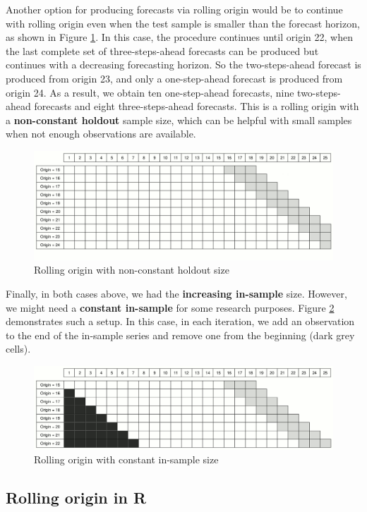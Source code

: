 \documentclass[
]{book}
\theoremstyle{definition}
\theoremstyle{definition}
\theoremstyle{definition}
\theoremstyle{definition}
\theoremstyle{remark}
\begin{document}
Another option for producing forecasts via rolling origin would be to continue with rolling origin even when the test sample is smaller than the forecast horizon, as shown in Figure \ref{fig:ROProcessNoCO}. In this case, the procedure continues until origin 22, when the last complete set of three-steps-ahead forecasts can be produced but continues with a decreasing forecasting horizon. So the two-steps-ahead forecast is produced from origin 23, and only a one-step-ahead forecast is produced from origin 24. As a result, we obtain ten one-step-ahead forecasts, nine two-steps-ahead forecasts and eight three-steps-ahead forecasts. This is a rolling origin with a \textbf{non-constant holdout} sample size, which can be helpful with small samples when not enough observations are available.

\begin{figure}
\includegraphics[width=0.75\linewidth]{./images/03-ROProcessNoCO} \caption{Rolling origin with non-constant holdout size}\label{fig:ROProcessNoCO}
\end{figure}

Finally, in both cases above, we had the \textbf{increasing in-sample} size. However, we might need a \textbf{constant in-sample} for some research purposes. Figure \ref{fig:ROProcessCOCI} demonstrates such a setup. In this case, in each iteration, we add an observation to the end of the in-sample series and remove one from the beginning (dark grey cells).

\begin{figure}
\includegraphics[width=0.75\linewidth]{./images/03-ROProcessCOCI} \caption{Rolling origin with constant in-sample size}\label{fig:ROProcessCOCI}
\end{figure}

\hypertarget{rolling-origin-in-r}{%
\subsection{Rolling origin in R}\label{rolling-origin-in-r}}
\end{document}
